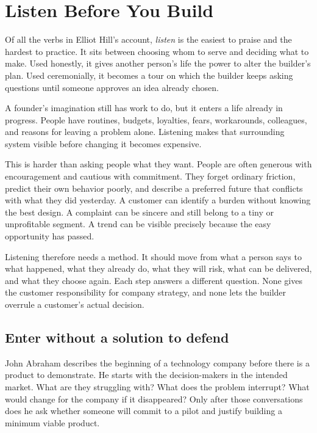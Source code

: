 \chapter{Listen Before You Build}

Of all the verbs in Elliot Hill's account, \emph{listen} is the easiest to
praise and the hardest to practice. It sits between choosing whom to serve and
deciding what to make. Used honestly, it gives another person's life the power
to alter the builder's plan. Used ceremonially, it becomes a tour on which the
builder keeps asking questions until someone approves an idea already chosen.

A founder's imagination still has work to do, but it enters a life already in
progress. People have routines, budgets, loyalties, fears, workarounds,
colleagues, and reasons for leaving a problem alone. Listening makes that
surrounding system visible before changing it becomes expensive.

This is harder than asking people what they want. People are often generous
with encouragement and cautious with commitment. They forget ordinary
friction, predict their own behavior poorly, and describe a preferred future
that conflicts with what they did yesterday. A customer can identify a burden
without knowing the best design. A complaint can be sincere and still belong
to a tiny or unprofitable segment. A trend can be visible precisely because the
easy opportunity has passed.

Listening therefore needs a method. It should move from what a person says to
what happened, what they already do, what they will risk, what can be delivered,
and what they choose again. Each step answers a different question. None gives
the customer responsibility for company strategy, and none lets the builder
overrule a customer's actual decision.

\section{Enter without a solution to defend}

John Abraham describes the beginning of a technology company before there is a
product to demonstrate. He starts with the decision-makers in the intended
market. What are they struggling with? What does the problem interrupt? What
would change for the company if it disappeared? Only after those conversations
does he ask whether someone will commit to a pilot and justify building a
minimum viable product.

